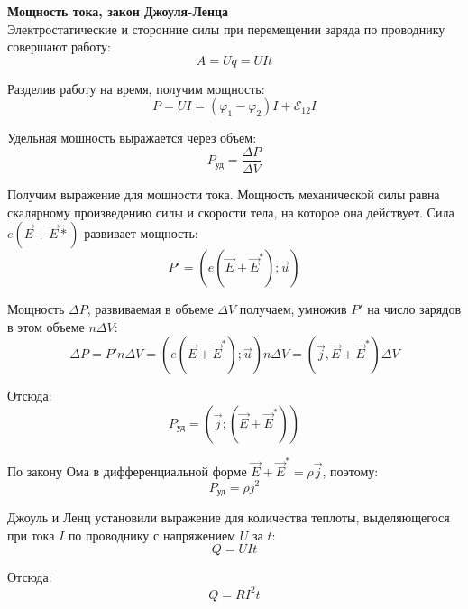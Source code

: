 \documentclass{article}
\begin{document}
	
	\textbf{Мощность тока, закон Джоуля-Ленца}\\

	Электростатические и сторонние силы при перемещении заряда по проводнику совершают работу:
	\begin{equation}
		A = Uq = UIt
	\end{equation}

	Разделив работу на время, получим мощность:
	\begin{equation}
		P = UI = (\varphi_1-\varphi_2)I + \mathcal{E}_{12}I
	\end{equation}

	Удельная мошность выражается через объем:
	\begin{equation}
		P_{\text{уд}} = \frac{\Delta P}{\Delta V}
	\end{equation}

	Получим выражение для мощности тока. Мощность механической силы равна скалярному произведению силы и скорости тела, на которое она действует. Сила $e(\vec E + \vec E*)$ развивает мощность:
	\begin{equation}
		P' = (e(\vec E + \vec E^*);\vec u)
	\end{equation}

	Мощность $\Delta P$, развиваемая в объеме $\Delta V$ получаем, умножив $P'$ на число зарядов в этом объеме $n\Delta V$:
	\begin{equation}
		\Delta P = P'n\Delta V = (e(\vec E + \vec E^*);\vec u) n\Delta V = (\vec j,\vec E + \vec E^*)\Delta V
	\end{equation}

	Отсюда:
	\begin{equation}
		P_{\text{уд}} = (\vec j;(\vec E + \vec E^*))
	\end{equation}

	По закону Ома в дифференциальной форме $\vec E + \vec E^* = \rho \vec j$, поэтому:
	\begin{equation}
		P_\text{уд} = \rho j^2
	\end{equation}

	Джоуль и Ленц установили выражение для количества теплоты, выделяющегося при тока $I$ по проводнику с напряжением $U$ за $t$:
	\begin{equation}
		Q = UIt
	\end{equation}

	Отсюда:
	\begin{equation}
		Q = RI^2 t
	\end{equation}
\end{document}

